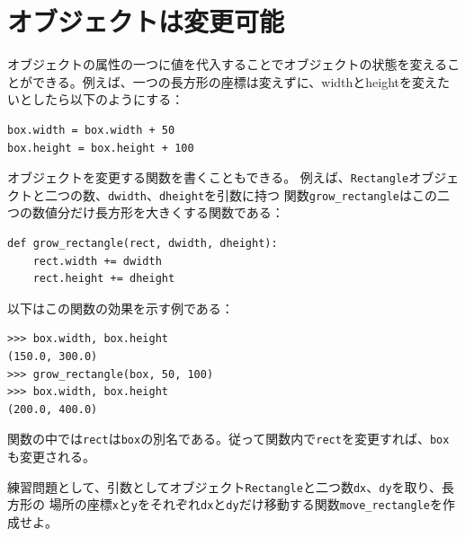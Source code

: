 \documentclass[a4j,12pt,makeidx]{jbook}
\begin{document}
\section{オブジェクトは変更可能}
オブジェクトの属性の一つに値を代入することでオブジェクトの状態を変えることができる。例えば、一つの長方形の座標は変えずに、widthとheightを変えたいとしたら以下のようにする：
\begin{verbatim}
box.width = box.width + 50
box.height = box.height + 100
\end{verbatim}
オブジェクトを変更する関数を書くこともできる。
例えば、{\tt Rectangle}オブジェクトと二つの数、{\tt dwidth}、{\tt dheight}を引数に持つ
関数{\tt grow\_rectangle}はこの二つの数値分だけ長方形を大きくする関数である：
\begin{verbatim}
def grow_rectangle(rect, dwidth, dheight):
    rect.width += dwidth
    rect.height += dheight
\end{verbatim}
以下はこの関数の効果を示す例である：
\begin{verbatim}
>>> box.width, box.height
(150.0, 300.0)
>>> grow_rectangle(box, 50, 100)
>>> box.width, box.height
(200.0, 400.0)
\end{verbatim}
関数の中では{\tt rect}は{\tt box}の別名である。従って関数内で{\tt rect}を変更すれば、{\tt box}も変更される。\par
練習問題として、引数としてオブジェクト{\tt Rectangle}と二つ数{\tt dx}、{\tt dy}を取り、長方形の
場所の座標{\tt x}と{\tt y}をそれぞれ{\tt dx}と{\tt dy}だけ移動する関数{\tt move\_rectangle}を作成せよ。
%
\end{document}
